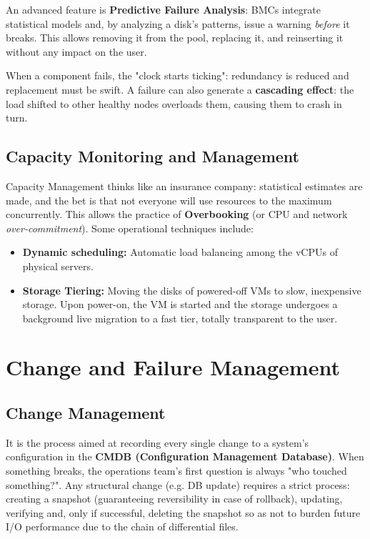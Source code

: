 An advanced feature is \textbf{Predictive Failure Analysis}: BMCs integrate statistical models and, by analyzing a disk's patterns, issue a warning \textit{before} it breaks. This allows removing it from the pool, replacing it, and reinserting it without any impact on the user.
\begin{warningbox}
When a component fails, the "clock starts ticking": redundancy is reduced and replacement must be swift. A failure can also generate a \textbf{cascading effect}: the load shifted to other healthy nodes overloads them, causing them to crash in turn.
\end{warningbox}

\subsection{Capacity Monitoring and Management}
Capacity Management thinks like an insurance company: statistical estimates are made, and the bet is that not everyone will use resources to the maximum concurrently. This allows the practice of \textbf{Overbooking} (or CPU and network \textit{over-commitment}).
Some operational techniques include:
\begin{itemize}
    \item \textbf{Dynamic scheduling:} Automatic load balancing among the vCPUs of physical servers.
    \item \textbf{Storage Tiering:} Moving the disks of powered-off VMs to slow, inexpensive storage. Upon power-on, the VM is started and the storage undergoes a background live migration to a fast tier, totally transparent to the user.
\end{itemize}

\section{Change and Failure Management}

\subsection{Change Management}
It is the process aimed at recording every single change to a system's configuration in the \textbf{CMDB (Configuration Management Database)}. When something breaks, the operations team's first question is always "who touched something?". Any structural change (e.g. DB update) requires a strict process: creating a snapshot (guaranteeing reversibility in case of rollback), updating, verifying and, only if successful, deleting the snapshot so as not to burden future I/O performance due to the chain of differential files.

